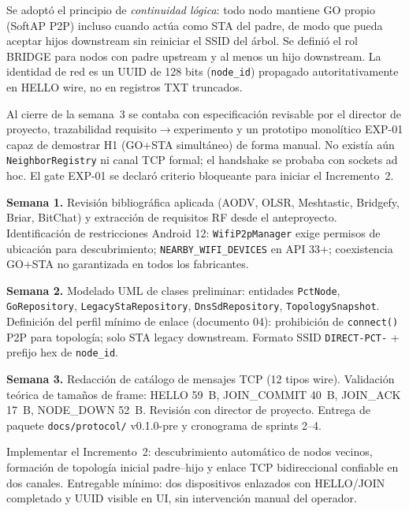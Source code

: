
Se adoptó el principio de \emph{continuidad lógica}: todo nodo mantiene GO propio (SoftAP P2P) incluso cuando actúa como STA del padre, de modo que pueda aceptar hijos downstream sin reiniciar el SSID del árbol. Se definió el rol BRIDGE para nodos con padre upstream y al menos un hijo downstream. La identidad de red es un UUID de 128 bits (\texttt{node\_id}) propagado autoritativamente en HELLO wire, no en registros TXT truncados.


Al cierre de la semana~3 se contaba con especificación revisable por el director de proyecto, trazabilidad requisito$\rightarrow$experimento y un prototipo monolítico EXP-01 capaz de demostrar H1 (GO+STA simultáneo) de forma manual. No existía aún \texttt{NeighborRegistry} ni canal TCP formal; el handshake se probaba con sockets ad hoc. El gate EXP-01 se declaró criterio bloqueante para iniciar el Incremento~2.


\textbf{Semana 1.} Revisión bibliográfica aplicada (AODV, OLSR, Meshtastic, Bridgefy, Briar, BitChat) y extracción de requisitos RF desde el anteproyecto. Identificación de restricciones Android 12: \texttt{WifiP2pManager} exige permisos de ubicación para descubrimiento; \texttt{NEARBY\_WIFI\_DEVICES} en API 33+; coexistencia GO+STA no garantizada en todos los fabricantes.

\textbf{Semana 2.} Modelado UML de clases preliminar: entidades \texttt{PctNode}, \texttt{GoRepository}, \texttt{LegacyStaRepository}, \texttt{DnsSdRepository}, \texttt{TopologySnapshot}. Definición del perfil mínimo de enlace (documento 04): prohibición de \texttt{connect()} P2P para topología; solo STA legacy downstream. Formato SSID \texttt{DIRECT-PCT-} + prefijo hex de \texttt{node\_id}.

\textbf{Semana 3.} Redacción de catálogo de mensajes TCP (12 tipos wire). Validación teórica de tamaños de frame: HELLO 59~B, JOIN\_COMMIT 40~B, JOIN\_ACK 17~B, NODE\_DOWN 52~B. Revisión con director de proyecto. Entrega de paquete \texttt{docs/protocol/} v0.1.0-pre y cronograma de sprints 2--4.



Implementar el Incremento~2: descubrimiento automático de nodos vecinos, formación de topología inicial padre--hijo y enlace TCP bidireccional confiable en dos canales. Entregable mínimo: dos dispositivos enlazados con HELLO/JOIN completado y UUID visible en UI, sin intervención manual del operador.

